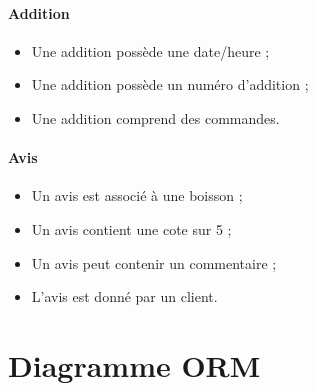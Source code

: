 \paragraph{Addition}
\begin{itemize}
	\item Une addition possède une date/heure ;
	\item Une addition possède un numéro d’addition ;
	\item Une addition comprend des commandes.
\end{itemize}

\paragraph{Avis}
\begin{itemize}
	\item Un avis est associé à une boisson ;
	\item Un avis contient une cote sur 5 ;
	\item Un avis peut contenir un commentaire ;
	\item L'avis est donné par un client.
\end{itemize}

\section{Diagramme ORM}
\label{sec:orm}

